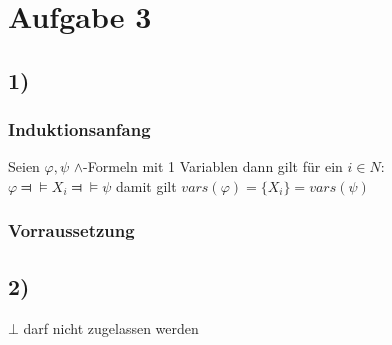 \section*{Aufgabe 3}

\subsection*{1)}

\subsubsection*{Induktionsanfang}
Seien $\varphi , \psi$ $\wedge$-Formeln mit 1 Variablen dann gilt für ein $i \in N $:\\
$\varphi \Dashv \vDash X_i \Dashv \vDash \psi$ damit gilt $vars(\varphi)=\{ X_i \}=vars(\psi)$\\

\subsubsection*{Vorraussetzung}











\subsection*{2)}
$\bot $ darf nicht zugelassen werden